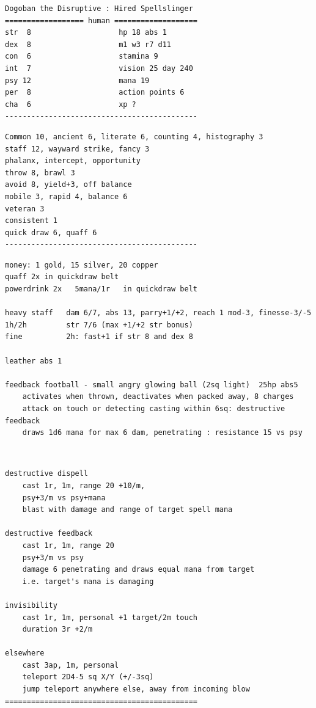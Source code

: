 \small \begin{samepage} \begin{verbatim}
Dogoban the Disruptive : Hired Spellslinger
================== human ===================
str  8                    hp 18 abs 1
dex  8                    m1 w3 r7 d11
con  6                    stamina 9
int  7                    vision 25 day 240
psy 12                    mana 19
per  8                    action points 6
cha  6                    xp ?
--------------------------------------------
\end{verbatim} \end{samepage} \goodbreak \begin{samepage} \begin{verbatim}
Common 10, ancient 6, literate 6, counting 4, histography 3
staff 12, wayward strike, fancy 3
phalanx, intercept, opportunity
throw 8, brawl 3
avoid 8, yield+3, off balance
mobile 3, rapid 4, balance 6
veteran 3
consistent 1
quick draw 6, quaff 6
--------------------------------------------
\end{verbatim} \end{samepage} \goodbreak \begin{samepage} \begin{verbatim}
money: 1 gold, 15 silver, 20 copper
quaff 2x in quickdraw belt
powerdrink 2x   5mana/1r   in quickdraw belt

heavy staff   dam 6/7, abs 13, parry+1/+2, reach 1 mod-3, finesse-3/-5
1h/2h         str 7/6 (max +1/+2 str bonus)
fine          2h: fast+1 if str 8 and dex 8

leather abs 1

feedback football - small angry glowing ball (2sq light)  25hp abs5
    activates when thrown, deactivates when packed away, 8 charges
    attack on touch or detecting casting within 6sq: destructive feedback
    draws 1d6 mana for max 6 dam, penetrating : resistance 15 vs psy
\end{verbatim} \end{samepage} \ \goodbreak \begin{samepage} \begin{verbatim}
destructive dispell
    cast 1r, 1m, range 20 +10/m, 
    psy+3/m vs psy+mana
    blast with damage and range of target spell mana

destructive feedback
    cast 1r, 1m, range 20
    psy+3/m vs psy
    damage 6 penetrating and draws equal mana from target
    i.e. target's mana is damaging

invisibility
    cast 1r, 1m, personal +1 target/2m touch
    duration 3r +2/m

elsewhere
    cast 3ap, 1m, personal
    teleport 2D4-5 sq X/Y (+/-3sq)
    jump teleport anywhere else, away from incoming blow
============================================
\end{verbatim} \end{samepage} \normalsize
